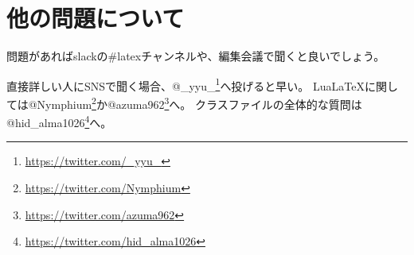 \documentclass{word}
\begin{document}
\section{他の問題について}

問題があればslackの\#latexチャンネルや、編集会議で聞くと良いでしょう。

直接詳しい人にSNSで聞く場合、@\_yyu\_\footnote{\url{https://twitter.com/_yyu_}}へ投げると早い。
Lua\LaTeX に関しては@Nymphium\footnote{\url{https://twitter.com/Nymphium}}か@azuma962\footnote{\url{https://twitter.com/azuma962}}へ。
クラスファイルの全体的な質問は@hid\_alma1026\footnote{\url{https://twitter.com/hid_alma1026}}へ。
\end{document}
